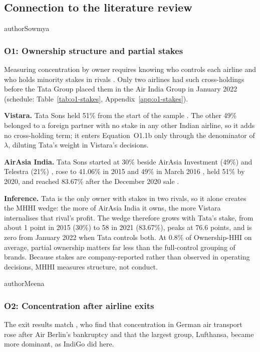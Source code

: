 \subsection{Connection to the literature review}
\begin{mergedcontribution}{authorSowmya}
\subsubsection{O1: Ownership structure and partial stakes}
Measuring concentration by owner requires knowing who controls each airline and who holds minority stakes in rivals \parencite{obriensalop2000}. Only two airlines had such cross-holdings before the Tata Group placed them in the Air India Group in January 2022 (schedule: Table~\ref{tab:o1-stakes}, Appendix~\ref{app:o1-stakes}).

\textbf{Vistara.} Tata Sons held 51\% from the start of the sample \parencite{sia2015annual,sia2022merger}. The other 49\% belonged to a foreign partner with no stake in any other Indian airline, so it adds no cross-holding term; it enters Equation~O1.1b only through the denominator of $\lambda$, diluting Tata's weight in Vistara's decisions.

\textbf{AirAsia India.} Tata Sons started at 30\% beside AirAsia Investment (49\%) and Telestra (21\%) \parencite{airasia2013jv}, rose to 41.06\% in 2015 and 49\% in March 2016 \parencite{tata2016airasia,airasia2018q4}, held 51\% by 2020, and reached 83.67\% after the December 2020 sale \parencite{airasia2021disposal,airasia2021results}.

\textbf{Inference.} Tata is the only owner with stakes in two rivals, so it alone creates the MHHI wedge: the more of AirAsia India it owns, the more Vistara internalises that rival's profit. The wedge therefore grows with Tata's stake, from about 1 point in 2015 (30\%) to 58 in 2021 (83.67\%), peaks at 76.6 points, and is zero from January 2022 when Tata controls both. At 0.8\% of Ownership-HHI on average, partial ownership matters far less than the full-control grouping of brands. Because stakes are company-reported rather than observed in operating decisions, MHHI measures structure, not conduct.
\end{mergedcontribution}

\begin{mergedcontribution}{authorMeena}
\subsubsection{O2: Concentration after airline exits}
The exit results match \textcite{grosche2020concentration}, who find that concentration in German air transport rose after Air Berlin's bankruptcy and that the largest group, Lufthansa, became more dominant, as IndiGo did here.
\end{mergedcontribution}

